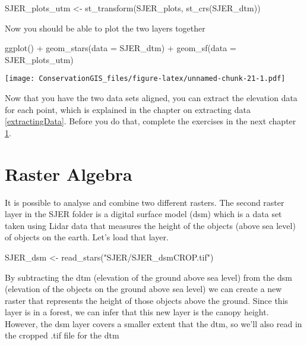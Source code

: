 \documentclass[
]{book}
\newenvironment{Shaded}{\begin{snugshade}}{\end{snugshade}}
\newcommand{\AttributeTok}[1]{\textcolor[rgb]{0.77,0.63,0.00}{#1}}
\newcommand{\FunctionTok}[1]{\textcolor[rgb]{0.00,0.00,0.00}{#1}}
\newcommand{\NormalTok}[1]{#1}
\newcommand{\OtherTok}[1]{\textcolor[rgb]{0.56,0.35,0.01}{#1}}
\newcommand{\SpecialCharTok}[1]{\textcolor[rgb]{0.00,0.00,0.00}{#1}}
\newcommand{\StringTok}[1]{\textcolor[rgb]{0.31,0.60,0.02}{#1}}
\begin{document}
\begin{Shaded}
\begin{Highlighting}[]
\NormalTok{SJER\_plots\_utm }\OtherTok{\textless{}{-}} \FunctionTok{st\_transform}\NormalTok{(SJER\_plots, }\FunctionTok{st\_crs}\NormalTok{(SJER\_dtm))}
\end{Highlighting}
\end{Shaded}

Now you should be able to plot the two layers together

\begin{Shaded}
\begin{Highlighting}[]
\FunctionTok{ggplot}\NormalTok{() }\SpecialCharTok{+}
  \FunctionTok{geom\_stars}\NormalTok{(}\AttributeTok{data =}\NormalTok{ SJER\_dtm) }\SpecialCharTok{+}
  \FunctionTok{geom\_sf}\NormalTok{(}\AttributeTok{data =}\NormalTok{ SJER\_plots\_utm)}
\end{Highlighting}
\end{Shaded}

\texttt{[image: ConservationGIS\_files/figure-latex/unnamed-chunk-21-1.pdf]}

Now that you have the two data sets aligned, you can extract the elevation data for each point, which is explained in the chapter on extracting data \ref{extractingData}. Before you do that, complete the exercises in the next chapter \ref{rasterAlgebra}.

\hypertarget{rasterAlgebra}{%
\chapter{Raster Algebra}\label{rasterAlgebra}}

It is possible to analyse and combine two different rasters. The second raster layer in the SJER folder is a digital surface model (dsm) which is a data set taken using Lidar data that measures the height of the objects (above sea level) of objects on the earth. Let's load that layer.

\begin{Shaded}
\begin{Highlighting}[]
\NormalTok{SJER\_dsm }\OtherTok{\textless{}{-}} \FunctionTok{read\_stars}\NormalTok{(}\StringTok{"SJER/SJER\_dsmCROP.tif"}\NormalTok{)}
\end{Highlighting}
\end{Shaded}

By subtracting the dtm (elevation of the ground above sea level) from the dsm (elevation of the objects on the ground above sea level) we can create a new raster that represents the height of those objects above the ground. Since this layer is in a forest, we can infer that this new layer is the canopy height. However, the dsm layer covers a smaller extent that the dtm, so we'll also read in the cropped .tif file for the dtm
\end{document}
